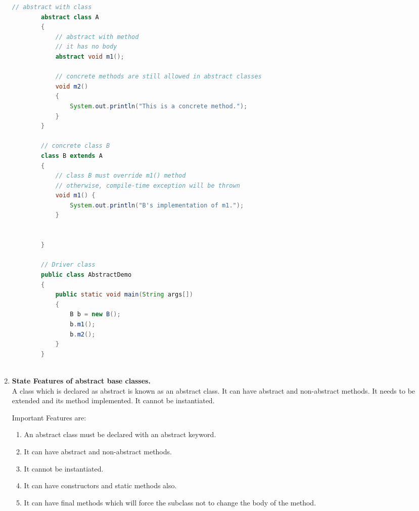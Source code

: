 \documentclass[11pt]{article}
\begin{document}
\begin{enumerate}
\begin{lstlisting}[language=Java]
		// abstract with class
		abstract class A
		{
			// abstract with method
			// it has no body
			abstract void m1();
			
			// concrete methods are still allowed in abstract classes
			void m2()
			{
				System.out.println("This is a concrete method.");
			}
		}
		
		// concrete class B
		class B extends A
		{
			// class B must override m1() method
			// otherwise, compile-time exception will be thrown
			void m1() {
				System.out.println("B's implementation of m1.");
			}
			
			
		}
		
		// Driver class
		public class AbstractDemo
		{
			public static void main(String args[])
			{
				B b = new B();
				b.m1();
				b.m2();
			}
		}
				
	\end{lstlisting}
	\item \textbf{State Features of abstract base classes.} \\
	      A class which is declared as abstract is known as an abstract class. It can have abstract and non-abstract methods. It needs to be extended and its method implemented. It cannot be instantiated.

	      Important Features are:
	      \begin{enumerate}
		      \item An abstract class must be declared with an abstract keyword.
		      \item It can have abstract and non-abstract methods.
		      \item It cannot be instantiated.
		      \item It can have constructors and static methods also.
		      \item It can have final methods which will force the subclass not to change the body of the method.
	      \end{enumerate}
\end{enumerate}
\end{document}
